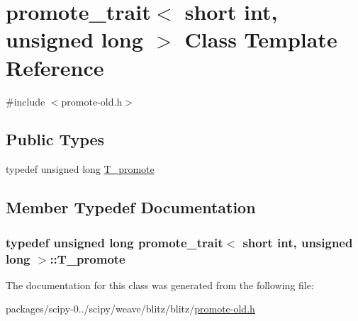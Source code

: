 \hypertarget{classpromote__trait_3_01short_01int_00_01unsigned_01long_01_4}{}\section{promote\+\_\+trait$<$ short int, unsigned long $>$ Class Template Reference}
\label{classpromote__trait_3_01short_01int_00_01unsigned_01long_01_4}


{\ttfamily \#include $<$promote-\/old.\+h$>$}

\subsection*{Public Types}
\begin{DoxyCompactItemize}
\item 
typedef unsigned long \hyperlink{classpromote__trait_3_01short_01int_00_01unsigned_01long_01_4_a2c7b00924d62be7641cbe926ea0c34d8}{T\+\_\+promote}
\end{DoxyCompactItemize}


\subsection{Member Typedef Documentation}
\hypertarget{classpromote__trait_3_01short_01int_00_01unsigned_01long_01_4_a2c7b00924d62be7641cbe926ea0c34d8}{}
\subsubsection[{T\+\_\+promote}]{\setlength{\rightskip}{0pt plus 5cm}typedef unsigned long {\bf promote\+\_\+trait}$<$ short int, unsigned long $>$\+::{\bf T\+\_\+promote}}\label{classpromote__trait_3_01short_01int_00_01unsigned_01long_01_4_a2c7b00924d62be7641cbe926ea0c34d8}


The documentation for this class was generated from the following file\+:\begin{DoxyCompactItemize}
\item 
packages/scipy-\/0../scipy/weave/blitz/blitz/\hyperlink{promote-old_8h}{promote-\/old.\+h}\end{DoxyCompactItemize}
